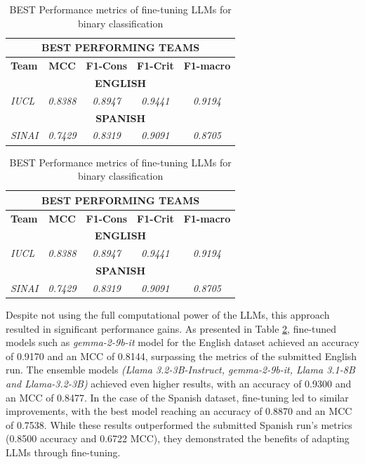 \documentclass{Configuration_Files/PoliMi3i_thesis}
\begin{document}
\begin{table}[H] 
\centering
\small
\begin{tabular}{lcccc}
\hline 
\multicolumn{5}{c}{BEST PERFORMING TEAMS} \\
\hline 
\textbf{Team} & \textbf{MCC} & \textbf{F1-Cons} & \textbf{F1-Crit} & \textbf{F1-macro} \\ 
\hline 
\multicolumn{5}{c}{\textbf{ENGLISH}} \\
\hline 
\textit{IUCL} & \textit{0.8388} & \textit{0.8947} & \textit{0.9441} & \textit{0.9194} \\
\hline
\multicolumn{5}{c}{\textbf{SPANISH}} \\
\hline 
\textit{SINAI} & \textit{0.7429} & \textit{0.8319} & \textit{0.9091} & \textit{0.8705} \\ 
\hline
\end{tabular} 
\caption{BEST Performance metrics of fine-tuning LLMs for binary classification} 
\label{tab:performance_T1_LLM_fine_tuned} 
\end{table}
\FloatBarrier


\begin{table}[H] 
\centering
\small
\begin{tabular}{lcccc}
\hline 
\multicolumn{5}{c}{BEST PERFORMING TEAMS} \\
\hline 
\textbf{Team} & \textbf{MCC} & \textbf{F1-Cons} & \textbf{F1-Crit} & \textbf{F1-macro} \\ 
\hline 
\multicolumn{5}{c}{\textbf{ENGLISH}} \\
\hline 
\textit{IUCL} & \textit{0.8388} & \textit{0.8947} & \textit{0.9441} & \textit{0.9194} \\
\hline
\multicolumn{5}{c}{\textbf{SPANISH}} \\
\hline 
\textit{SINAI} & \textit{0.7429} & \textit{0.8319} & \textit{0.9091} & \textit{0.8705} \\ 
\hline
\end{tabular} 
\caption{BEST Performance metrics of fine-tuning LLMs for binary classification} 
\label{tab:performance_T1_LLM_fine_tuned} 
\end{table}
\FloatBarrier


Despite not using the full computational power of the LLMs, this approach resulted in significant performance gains. As presented in Table \ref{tab:performance_T1_LLM_fine_tuned}, fine-tuned models such as \textit{gemma-2-9b-it} model for the English dataset achieved an accuracy of 0.9170 and an MCC of 0.8144, surpassing the metrics of the submitted English run. The ensemble models \textit{(Llama 3.2-3B-Instruct, gemma-2-9b-it, Llama 3.1-8B and Llama-3.2-3B)} achieved even higher results, with an accuracy of 0.9300 and an MCC of 0.8477. In the case of the Spanish dataset, fine-tuning led to similar improvements, with the best model reaching an accuracy of 0.8870 and an MCC of 0.7538. While these results outperformed the submitted Spanish run's metrics (0.8500 accuracy and 0.6722 MCC), they demonstrated the benefits of adapting LLMs through fine-tuning.
\end{document}
